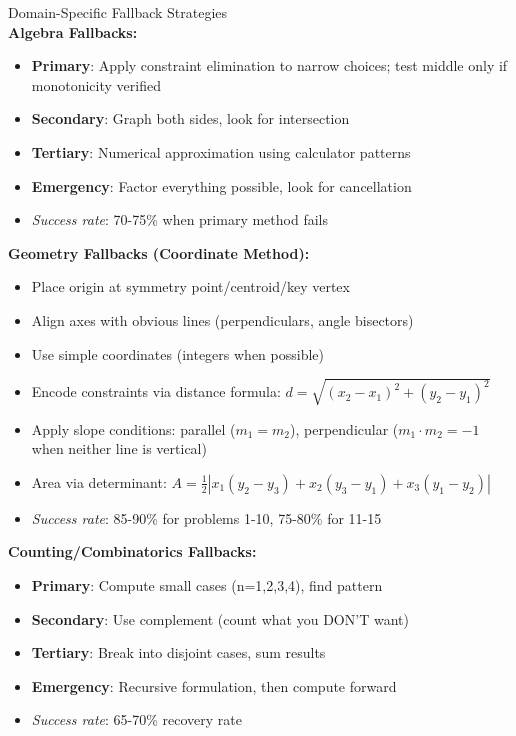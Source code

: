 \documentclass{article}
\begin{document}
\hypertarget{coord-fallback}{}
\begin{classifybox}{Domain-Specific Fallback Strategies}
{\footnotesize\textcolor{timegreen}{}}\\

\textbf{Algebra Fallbacks:}
\begin{itemize}[nosep]
\item \textbf{Primary}: Apply constraint elimination to narrow choices; test middle only if monotonicity verified
\item \textbf{Secondary}: Graph both sides, look for intersection
\item \textbf{Tertiary}: Numerical approximation using calculator patterns
\item \textbf{Emergency}: Factor everything possible, look for cancellation
\item \textit{Success rate}: 70-75\% when primary method fails
\end{itemize}

\textbf{Geometry Fallbacks (Coordinate Method):}
\begin{itemize}[nosep]
\item Place origin at symmetry point/centroid/key vertex
\item Align axes with obvious lines (perpendiculars, angle bisectors)
\item Use simple coordinates (integers when possible)
\item Encode constraints via distance formula: $d = \sqrt{(x_2-x_1)^2 + (y_2-y_1)^2}$
\item Apply slope conditions: parallel ($m_1 = m_2$), perpendicular ($m_1 \cdot m_2 = -1$ when neither line is vertical)
\item Area via determinant: $A = \frac{1}{2}|x_1(y_2-y_3) + x_2(y_3-y_1) + x_3(y_1-y_2)|$
\item \textit{Success rate}: 85-90\% for problems 1-10, 75-80\% for 11-15
\end{itemize}

\textbf{Counting/Combinatorics Fallbacks:}
\begin{itemize}[nosep]
\item \textbf{Primary}: Compute small cases (n=1,2,3,4), find pattern
\item \textbf{Secondary}: Use complement (count what you DON'T want)
\item \textbf{Tertiary}: Break into disjoint cases, sum results
\item \textbf{Emergency}: Recursive formulation, then compute forward
\item \textit{Success rate}: 65-70\% recovery rate
\end{itemize}


\end{classifybox}
\end{document}
